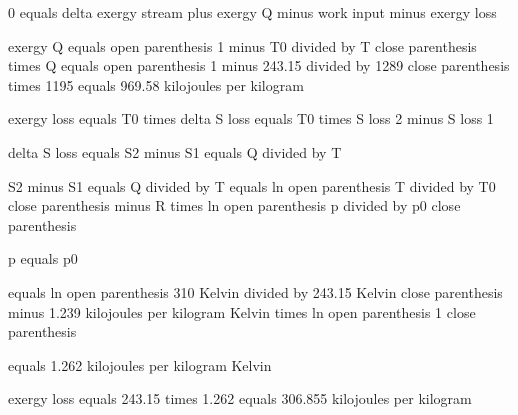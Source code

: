 0 equals delta exergy stream plus exergy Q minus work input minus exergy loss  

exergy Q equals open parenthesis 1 minus T0 divided by T close parenthesis times Q equals open parenthesis 1 minus 243.15 divided by 1289 close parenthesis times 1195 equals 969.58 kilojoules per kilogram  

exergy loss equals T0 times delta S loss equals T0 times S loss 2 minus S loss 1  

delta S loss equals S2 minus S1 equals Q divided by T  

S2 minus S1 equals Q divided by T equals ln open parenthesis T divided by T0 close parenthesis minus R times ln open parenthesis p divided by p0 close parenthesis  

p equals p0  

equals ln open parenthesis 310 Kelvin divided by 243.15 Kelvin close parenthesis minus 1.239 kilojoules per kilogram Kelvin times ln open parenthesis 1 close parenthesis  

equals 1.262 kilojoules per kilogram Kelvin  

exergy loss equals 243.15 times 1.262 equals 306.855 kilojoules per kilogram